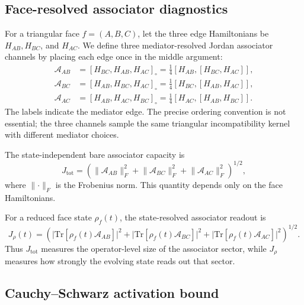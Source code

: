 \documentclass[aps,physrev,preprint,groupedaddress]{revtex4-2}
\begin{document}
\subsection{Face-resolved associator diagnostics}\label{sm:face_diagnostics}
For a triangular face $f=(A,B,C)$, let the three edge Hamiltonians be $H_{AB}, H_{BC}$, and $H_{AC}$. We define three
mediator-resolved Jordan associator channels by placing each edge once in the middle argument:
\begin{align}
    \mathcal{A}_{AB} &= [H_{BC},H_{AB},H_{AC}]_{\circ}=\frac{1}{4}[H_{AB},[H_{BC},H_{AC}]],\\
    \mathcal{A}_{BC} &= [H_{AB},H_{BC},H_{AC}]_{\circ}=\frac{1}{4}[H_{BC},[H_{AB},H_{AC}]],\\
    \mathcal{A}_{AC} &= [H_{AB},H_{AC},H_{BC}]_{\circ}=\frac{1}{4}[H_{AC},[H_{AB},H_{BC}]].
\end{align}
The labels indicate the mediator edge. The precise ordering convention is not essential; the three channels sample the same triangular incompatibility kernel with different mediator choices.

The state-independent bare associator capacity is
\begin{equation}
    J_{\mathrm{tot}} = (\lVert\mathcal{A}_{AB}\rVert_F^2 + \lVert\mathcal{A}_{BC}\rVert_F^2 + \lVert\mathcal{A}_{AC}\rVert_F^2)^{1/2},
\end{equation}
where $\lVert\cdot\rVert_F$ is the Frobenius norm. This quantity depends only on the face Hamiltonians.

For a reduced face state $\rho_f(t)$, the state-resolved associator readout is
\begin{equation}
    J_\rho(t)=(
    \lvert\mathrm{Tr}[\rho_f(t)\mathcal A_{AB}]\rvert^2 +
    \lvert\mathrm{Tr}[\rho_f(t)\mathcal A_{BC}]\rvert^2 +
    \lvert\mathrm{Tr}[\rho_f(t)\mathcal A_{AC}]\rvert^2)^{1/2}.
\end{equation}
Thus $J_{\mathrm{tot}}$ measures the operator-level size of the associator sector, while $J_\rho$ measures how strongly the evolving state reads out that sector.

\subsection{Cauchy--Schwarz activation bound}
\label{sm:algebra-cs-bound}
\end{document}
